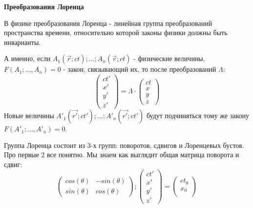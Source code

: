 \documentclass[12pt]{article}
\begin{document}
\begin{large}
\begin{center}
\LARGE \textbf{Преобразования Лоренца}
\end{center}
\par В физике преобразования Лоренца - линейная группа преобразований пространства времени,
относительно которой законы физики должны быть инварианты.
\par А именно, если $A_1(\vec{r}; ct); \dots; A_n(\vec{r}; ct)$ - физические величины,
\newline $F(A_1; \dots, A_n) = 0$ - закон, связывающий их, то после преобразований $\Lambda$:
    \begin{equation}
        \begin{pmatrix}
            ct'\\
            x'\\
            y'\\
            z'
        \end{pmatrix}
        = \Lambda \cdot
        \begin{pmatrix}
            ct\\
            x\\
            y\\
            z
        \end{pmatrix}
    \end{equation}
Новые величины $A'_1(\vec{r'}; ct'); \dots; A'_n(\vec{r'}; ct')$ будут подчиняться тому же закону
\newline $F(A'_1; \dots, A'_n) = 0$.
    \par Группа Лоренца состоит из 3-х групп: поворотов, сдвигов и Лоренцевых бустов.
    Про первые 2 все понятно. Мы знаем как выглядит общая матрица поворота и сдвиг:
    \begin{equation}
        \begin{pmatrix}
            cos(\theta) & -sin(\theta)\\
            sin(\theta) & cos(\theta)
        \end{pmatrix};
        \begin{pmatrix}
            ct'\\
            x'\\
            y'\\
            z'
        \end{pmatrix}
        =
        \begin{pmatrix}
            ct_0\\
            x_0\\

\end{pmatrix}
\end{equation}
\end{large}
\end{document}
